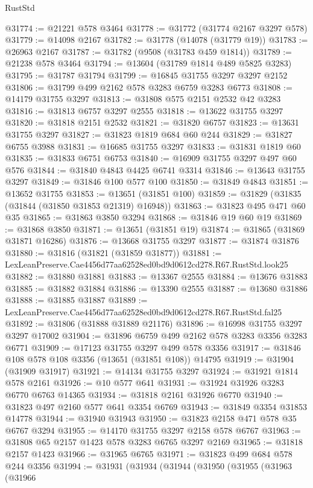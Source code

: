 \begin{lexlean}{RustStd}
\begin{coremodule}
@31774 := @21221 @578 @3464
@31778 := @31772 (@31774 @2167 @3297 @578)
@31779 := @14098 @2167
@31782 := @31778 (@14078 (@31779 @19))
@31783 := @26963 @2167
@31787 := @31782 (@9508 (@31783 @459 @1814))
@31789 := @21238 @578 @3464
@31794 := @13604 (@31789 @1814 @489 @5825 @3283)
@31795 := @31787 @31794
@31799 := @16845 @31755 @3297 @3297 @2152
@31806 := @31799 @499 @2162 @578 @3283 @6759 @3283 @6773
@31808 := @14179 @31755 @3297
@31813 := @31808 @575 @2151 @2532 @42 @3283
@31816 := @31813 @6757 @3297 @2555
@31818 := @13622 @31755 @3297
@31820 := @31818 @2151 @2532
@31821 := @31820 @6757
@31823 := @13631 @31755 @3297
@31827 := @31823 @1819 @684 @60 @244
@31829 := @31827 @6755 @3988
@31831 := @16685 @31755 @3297
@31833 := @31831 @1819 @60
@31835 := @31833 @6751 @6753
@31840 := @16909 @31755 @3297 @497 @60 @576
@31844 := @31840 @4843 @4425 @6741 @3314
@31846 := @13643 @31755 @3297
@31849 := @31846 @100 @577 @100
@31850 := @31849 @4843
@31851 := @13652 @31755
@31853 := @13651 (@31851 @100)
@31859 := @31829 (@31835 (@31844 (@31850 @31853 @21319) @16948))
@31863 := @31823 @495 @471 @60 @35
@31865 := @31863 @3850 @3294
@31868 := @31846 @19 @60 @19
@31869 := @31868 @3850
@31871 := @13651 (@31851 @19)
@31874 := @31865 (@31869 @31871 @16286)
@31876 := @13668 @31755 @3297
@31877 := @31874 @31876
@31880 := @31816 (@31821 (@31859 @31877))
@31881 := LexLeanPreserve.Cae4456d77aa62528ed0bd9d0612cd278.R67.RustStd.look25
@31882 := @31880 @31881
@31883 := @13367 @2555
@31884 := @13676 @31883
@31885 := @31882 @31884
@31886 := @13390 @2555
@31887 := @13680 @31886
@31888 := @31885 @31887
@31889 := LexLeanPreserve.Cae4456d77aa62528ed0bd9d0612cd278.R67.RustStd.fal25
@31892 := @31806 (@31888 @31889 @21176)
@31896 := @16998 @31755 @3297 @3297 @17002
@31904 := @31896 @6759 @499 @2162 @578 @3283 @3356 @3283 @6771
@31909 := @17123 @31755 @3297 @499 @578 @3356
@31917 := @31846 @108 @578 @108 @3356 (@13651 (@31851 @108)) @14795
@31919 := @31904 (@31909 @31917)
@31921 := @14134 @31755 @3297
@31924 := @31921 @1814 @578 @2161
@31926 := @10 @577 @641
@31931 := @31924 @31926 @3283 @6770 @6763 @14365
@31934 := @31818 @2161 @31926 @6770
@31940 := @31823 @497 @2160 @577 @641 @3354 @6769
@31943 := @31849 @3354 @31853 @14778
@31944 := @31940 @31943
@31950 := @31823 @2158 @471 @578 @35 @6767 @3294
@31955 := @14170 @31755 @3297 @2158 @578 @6767
@31963 := @31808 @65 @2157 @1423 @578 @3283 @6765 @3297 @2169
@31965 := @31818 @2157 @1423
@31966 := @31965 @6765
@31971 := @31823 @499 @684 @578 @244 @3356
@31994 := @31931
    (@31934
      (@31944
        (@31950
          (@31955
            (@31963
              (@31966

\end{coremodule}
\end{lexlean}
